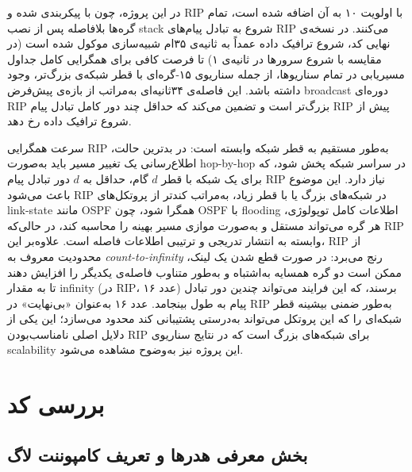 \documentclass{article}
\begin{document}
	در این پروژه، چون  با  پیکربندی شده و RIP با اولویت ۱۰ به آن اضافه شده است، تمام گره‌ها بلافاصله پس از نصب stack شروع به تبادل پیام‌های RIP می‌کنند. در نسخه‌ی نهایی کد، شروع ترافیک داده  عمداً به ثانیه‌ی ۳۵ام شبیه‌سازی موکول شده است (در مقایسه با شروع سرورها در ثانیه‌ی ۱) تا فرصت کافی برای همگرایی کامل جداول مسیریابی در تمام سناریوها، از جمله سناریوی ۱۵‑گره‌ای با قطر شبکه‌ی بزرگ‌تر، وجود داشته باشد. این فاصله‌ی ۳۴ثانیه‌ای به‌مراتب از بازه‌ی پیش‌فرض broadcast دوره‌ای RIP بزرگ‌تر است و تضمین می‌کند که حداقل چند دور کامل تبادل پیام RIP پیش از شروع ترافیک داده رخ دهد.
	
	سرعت همگرایی RIP به‌طور مستقیم به قطر شبکه  وابسته است: در بدترین حالت، اطلاع‌رسانی یک تغییر مسیر باید به‌صورت hop-by-hop در سراسر شبکه پخش شود، که برای یک شبکه با قطر $d$ گام، حداقل به $d$ دور تبادل پیام RIP نیاز دارد. این موضوع باعث می‌شود RIP در شبکه‌های بزرگ یا با قطر زیاد، به‌مراتب کندتر از پروتکل‌های link-state مانند OSPF همگرا شود، چون OSPF با flooding اطلاعات کامل توپولوژی، هر گره می‌تواند مستقل و به‌صورت موازی مسیر بهینه را محاسبه کند، در حالی‌که RIP وابسته به انتشار تدریجی و ترتیبی اطلاعات فاصله است. علاوه‌بر این، RIP از محدودیت معروف به \emph{count-to-infinity} رنج می‌برد: در صورت قطع شدن یک لینک، ممکن است دو گره همسایه به‌اشتباه و به‌طور متناوب فاصله‌ی یکدیگر را افزایش دهند تا به مقدار infinity (در RIP، عدد ۱۶) برسند، که این فرایند می‌تواند چندین دور تبادل پیام به طول بینجامد. عدد ۱۶ به‌عنوان «بی‌نهایت» در RIP به‌طور ضمنی بیشینه قطر شبکه‌ای را که این پروتکل می‌تواند به‌درستی پشتیبانی کند محدود می‌سازد؛ این یکی از دلایل اصلی نامناسب‌بودن RIP برای شبکه‌های بزرگ است که در نتایج سناریوی scalability این پروژه نیز به‌وضوح مشاهده می‌شود.
	

	\section{بررسی کد}
	
	\subsection{بخش معرفی هدر‌ها و تعریف کامپوننت لاگ}
	
	\lr{}
	
\end{document}
